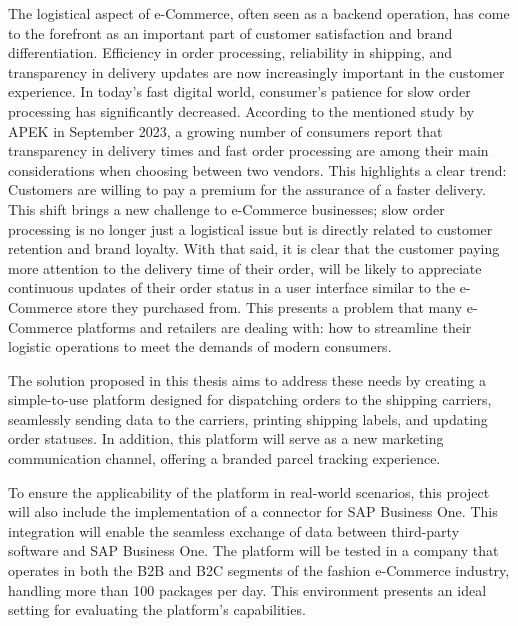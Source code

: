 The logistical aspect of e-Commerce, often seen as a backend operation, has come to the forefront as an important part of customer satisfaction and brand differentiation.
Efficiency in order processing, reliability in shipping, and transparency in delivery updates are now increasingly important in the customer experience.
In today's fast digital world, consumer's patience for slow order processing has significantly decreased.
According to the mentioned study by \ac{APEK} in September 2023, a growing number of consumers report that transparency in delivery times and fast order processing are among their main considerations when choosing between two vendors.
This highlights a clear trend: Customers are willing to pay a premium for the assurance of a faster delivery.
This shift brings a new challenge to e-Commerce businesses; slow order processing is no longer just a logistical issue but is directly related to customer retention and brand loyalty.
With that said, it is clear that the customer paying more attention to the delivery time of their order, will be likely to appreciate continuous updates of their order status in a user interface similar to the e-Commerce store they purchased from.
This presents a problem that many e-Commerce platforms and retailers are dealing with: how to streamline their logistic operations to meet the demands of modern consumers.

The solution proposed in this thesis aims to address these needs by creating a simple-to-use platform designed for dispatching orders to the shipping carriers, seamlessly sending data to the carriers, printing shipping labels, and updating order statuses.
In addition, this platform will serve as a new marketing communication channel, offering a branded parcel tracking experience.

To ensure the applicability of the platform in real-world scenarios, this project will also include the implementation of a connector for SAP Business One. This integration will enable the seamless exchange of data between third-party software and SAP Business One. The platform will be tested in a company that operates in both the \ac{B2B} and \ac{B2C} segments of the fashion e-Commerce industry, handling more than 100 packages per day. 
This environment presents an ideal setting for evaluating the platform's capabilities.


